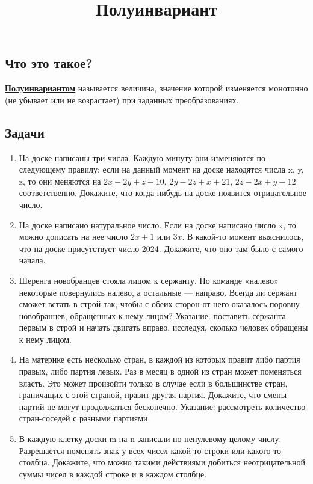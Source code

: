 \documentclass[a4paper,12pt]{article}
\title{Полуинвариант}
\begin{document}
\maketitle
    \subsection*{Что это такое?} \textbf{\underline{Полуинвариантом}} называется величина, значение которой изменяется монотонно (не убывает или не возрастает) при заданных преобразованиях.
    \subsection*{Задачи}
        \begin{enumerate}
            \item На доске написаны три числа. Каждую минуту они изменяются по следующему правилу: если на данный момент на доске находятся числа x, y, z, то они меняются на $2x-2y + z - 10$, $2y - 2z + x + 21$, $2z - 2x + y - 12$ соответственно. Докажите, что когда-нибудь на доске появится отрицательное число.
            \item На доске написано натуральное число. Если на доске написано число x, то можно дописать на нее число $2x + 1$ или $3x$. В какой-то момент выяснилось, что на доске присутствует число 2024. Докажите, что оно там было с самого начала.
            \item Шеренга новобранцев стояла лицом к сержанту. По команде «налево» некоторые повернулись налево, а остальные — направо. Всегда ли сержант сможет встать в строй так, чтобы с обеих сторон от него оказалось поровну новобранцев, обращенных к нему лицом? Указание: поставить сержанта первым в строй и начать двигать вправо, исследуя, сколько человек обращены к нему лицом.
            \item На материке есть несколько стран, в каждой из которых правит либо партия правых, либо партия левых. Раз в месяц в одной из стран может поменяться власть. Это может произойти только в случае если в большинстве стран, граничащих с этой страной, правит другая партия. Докажите, что смены партий не могут продолжаться бесконечно. Указание: рассмотреть количество стран-соседей с разными партиями.
            \item В каждую клетку доски m на n записали по ненулевому целому числу. Разрешается поменять знак у всех чисел какой-то строки или какого-то столбца. Докажите, что можно такими действиями добиться неотрицательной суммы чисел в каждой строке и в каждом столбце.
            
        \end{enumerate}
\end{document}
